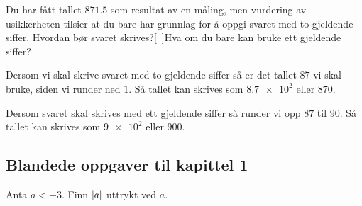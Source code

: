 \documentclass[a4paper,11pt]{article}
\begin{document}

\begin{problem}
  Du har fått tallet $\num{871.5}$ som resultat av en måling, men vurdering av
  usikkerheten tilsier at du bare har grunnlag for å oppgi svaret med to
  gjeldende siffer. Hvordan bør svaret skrives?[~]Hva om du bare 
  kan bruke ett gjeldende siffer? 
\end{problem}

\begin{solution}
  Dersom vi skal skrive svaret med to gjeldende siffer så er det tallet $87$ vi
  skal bruke, siden vi runder ned $1$. Så tallet kan skrives som
  $\num{8.7e2}$ eller $\num{870}$.

  Dersom svaret skal skrives med ett gjeldende siffer så runder vi opp $87$ til
  $90$. Så tallet kan skrives som $\num{9e2}$ eller
  $\num{900}$.
\end{solution}

\newpageLF


\subsection*{Blandede oppgaver til kapittel 1}


\begin{problem}[14]
  \label{problem:1-mix-14-MAT-0001-2019-V} Anta $a < -3$. Finn $\lvert a\rvert$ uttrykt
  ved $a$. 
\end{problem}
\end{document}
